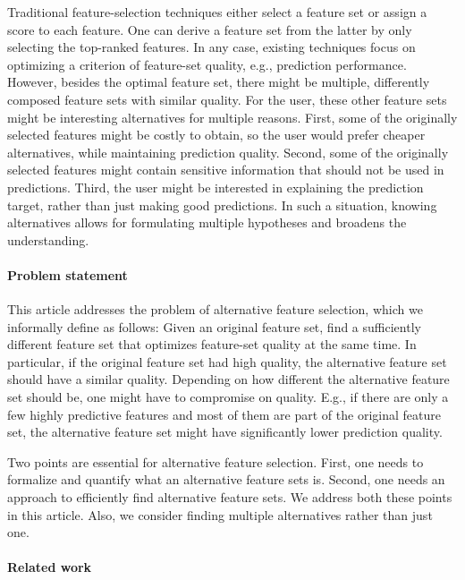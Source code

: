 \documentclass{article}
\theoremstyle{definition}
\begin{document}
Traditional feature-selection techniques either select a feature set or assign a score to each feature.
One can derive a feature set from the latter by only selecting the top-ranked features.
In any case, existing techniques focus on optimizing a criterion of feature-set quality, e.g., prediction performance.
However, besides the optimal feature set, there might be multiple, differently composed feature sets with similar quality.
For the user, these other feature sets might be interesting alternatives for multiple reasons.
First, some of the originally selected features might be costly to obtain, so the user would prefer cheaper alternatives, while maintaining prediction quality.
Second, some of the originally selected features might contain sensitive information that should not be used in predictions.
Third, the user might be interested in explaining the prediction target, rather than just making good predictions.
In such a situation, knowing alternatives allows for formulating multiple hypotheses and broadens the understanding.

\paragraph{Problem statement}

This article addresses the problem of alternative feature selection, which we informally define as follows:
Given an original feature set, find a sufficiently different feature set that optimizes feature-set quality at the same time.
In particular, if the original feature set had high quality, the alternative feature set should have a similar quality.
Depending on how different the alternative feature set should be, one might have to compromise on quality.
E.g., if there are only a few highly predictive features and most of them are part of the original feature set, the alternative feature set might have significantly lower prediction quality.

Two points are essential for alternative feature selection.
First, one needs to formalize and quantify what an alternative feature sets is.
Second, one needs an approach to efficiently find alternative feature sets.
We address both these points in this article.
Also, we consider finding multiple alternatives rather than just one.

\paragraph{Related work}
\end{document}

